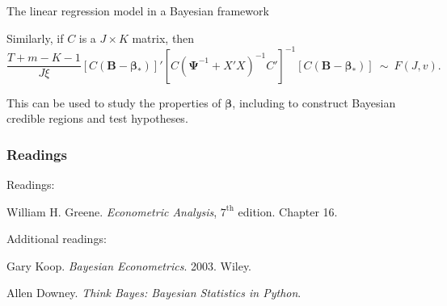 \documentclass[10pt]{beamer}
\theoremstyle{definition}
\begin{document}
\begin{section}{The linear regression model in a Bayesian framework}
\begin{frame}[fragile]
Similarly, if $C$ is a $J\times K$ matrix, then \begin{equation*}
\frac{T+m-K-1}{J\xi}[C(\mathbf{B}-\boldsymbol{\beta_*})]'[C(\boldsymbol{\Psi}^{-1}+X'X)^{-1}C']^{-1}[C(\mathbf{B}-\boldsymbol{\beta_*})]~\sim~ F(J,v).
\end{equation*}

This can be used to study the properties of $\boldsymbol{\beta}$, including to construct Bayesian credible regions and test hypotheses.
\end{frame}

\end{section}


\begin{frame}[fragile]
\frametitle{Readings}
Readings:\bigskip

William H. Greene. \emph{Econometric Analysis}, $ 7^{\text{th}} $ edition. Chapter 16.\bigskip \bigskip

Additional readings:\bigskip

Gary Koop. \emph{Bayesian Econometrics}. 2003. Wiley.
\bigskip

Allen Downey. \emph{Think Bayes: Bayesian Statistics in Python}.
\end{frame}
\end{document}
